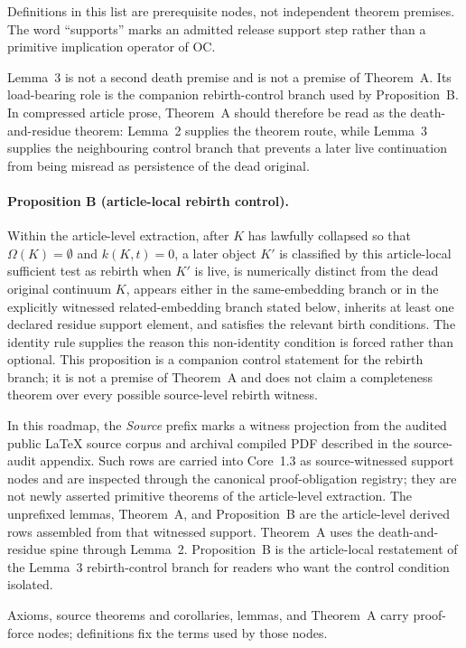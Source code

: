 Definitions in this list are prerequisite nodes, not independent theorem
premises. The word ``supports'' marks an admitted release support step rather
than a primitive implication operator of OC.

Lemma~3 is not a second death premise and is not a premise of Theorem~A. Its
load-bearing role is the companion rebirth-control branch used by
Proposition~B. In compressed article prose, Theorem~A should therefore be read
as the death-and-residue theorem: Lemma~2 supplies the theorem route, while
Lemma~3 supplies the neighbouring control branch that prevents a later live
continuation from being misread as persistence of the dead original.

\paragraph{Proposition B (article-local rebirth control).}
\label{prop:oc13-rebirth-control}
Within the article-level extraction, after \(K\) has lawfully collapsed so
that \(\Omega(K)=\emptyset\) and \(k(K,t)=0\), a later object \(K'\) is
classified by this article-local sufficient test as rebirth when \(K'\) is
live, is numerically distinct from the dead original continuum \(K\), appears
either in the same-embedding branch or in the explicitly witnessed
related-embedding branch stated below, inherits at least one declared residue
support element, and satisfies the relevant birth conditions. The identity rule
supplies the reason this non-identity condition is forced rather than optional.
This proposition is a companion control statement for the rebirth branch; it is
not a premise of Theorem~A and does not claim a completeness theorem over every
possible source-level rebirth witness.

In this roadmap, the \emph{Source} prefix marks a witness projection from the
audited public LaTeX source corpus and archival compiled PDF described in the
source-audit appendix. Such rows are carried into Core~1.3 as source-witnessed
support nodes and are inspected through the canonical proof-obligation
registry; they are not newly asserted primitive theorems of the article-level
extraction. The unprefixed lemmas, Theorem~A, and Proposition~B are the
article-level derived rows assembled from that witnessed support. Theorem~A
uses the death-and-residue spine through Lemma~2. Proposition~B is the
article-local restatement of the Lemma~3 rebirth-control branch for readers who
want the control condition isolated.

Axioms, source theorems and corollaries, lemmas, and Theorem~A carry
proof-force nodes; definitions fix the terms used by those nodes.

